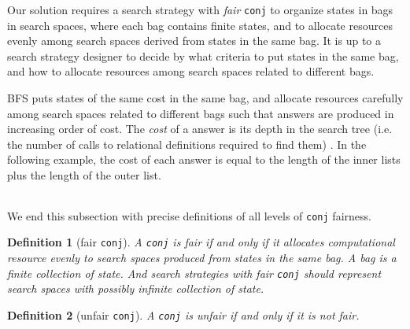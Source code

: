 \documentclass[format=acmlarge, review=true, authordraft=true]{acmart}
\newcommand{\conj}{\texttt{conj}}
\newtheorem{defn}{Definition}[section]
\begin{document}
\begin{center}
	\begin{tabular}{c}
		
	\end{tabular}
\end{center}

Our solution requires a search strategy with \emph{fair} \conj{} to organize
states in bags in search spaces, where each bag contains finite states, and 
to allocate resources evenly among search spaces derived from states in the 
same bag. It is up to a search strategy designer to decide by what criteria to 
put states in the same bag, and how to allocate resources among search spaces 
related to different bags.

BFS puts states of the same cost in the same bag, and allocate resources 
carefully among search spaces related to different bags such that answers are 
produced in increasing order of cost. The \emph{cost} of a answer is its depth 
in the search tree (i.e. the number of calls to relational definitions required 
to find them) \citep{seres1999algebra}. In the following example, the cost of 
each answer is equal to the length of the inner lists plus the length of the 
outer list. 

\begin{center}
	\begin{tabular}{c}
		
	\end{tabular}
\end{center}

We end this subsection with precise definitions of all levels of \conj{} 
fairness. 


\begin{defn}[fair \conj{}]
A \conj{} is fair if and only if it allocates computational resource evenly to 
search spaces produced from states in the same bag. A bag is a finite 
collection of state. And search strategies with fair \conj{} should represent 
search spaces with possibly infinite collection of state. 
\end{defn}

\begin{defn}[unfair \conj{}]
A \conj{} is unfair if and only if it is not fair.
\end{defn}
\end{document}
